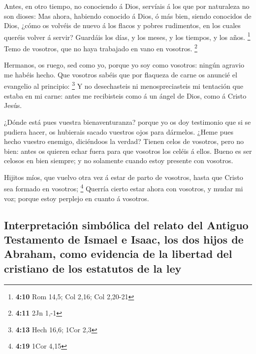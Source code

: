  Antes, en otro tiempo, no conociendo á Dios, servíais á los
que por naturaleza no son dioses:  Mas ahora, habiendo
conocido á Dios, ó más bien, siendo conocidos de Dios, ¿cómo os volvéis
de nuevo á los flacos y pobres rudimentos, en los cuales queréis volver
á servir?  Guardáis los días, y los meses, y los tiempos, y
los años. \footnote{\textbf{4:10} Rom 14,5; Col 2,16; Col 2,20-21}
 Temo de vosotros, que no haya trabajado en vano en
vosotros. \footnote{\textbf{4:11} 2Jn 1,-1}

 Hermanos, os ruego, sed como yo, porque yo soy como
vosotros: ningún agravio me habéis hecho.  Que vosotros
sabéis que por flaqueza de carne os anuncié el evangelio al principio:
\footnote{\textbf{4:13} Hech 16,6; 1Cor 2,3}  Y no
desechasteis ni menospreciasteis mi tentación que estaba en mi carne:
antes me recibisteis como á un ángel de Dios, como á Cristo Jesús.

 ¿Dónde está pues vuestra bienaventuranza? porque yo os doy
testimonio que si se pudiera hacer, os hubierais sacado vuestros ojos
para dármelos.  ¿Heme pues hecho vuestro enemigo,
diciéndoos la verdad?  Tienen celos de vosotros, pero no
bien: antes os quieren echar fuera para que vosotros los celéis á ellos.
 Bueno es ser celosos en bien siempre; y no solamente
cuando estoy presente con vosotros.

 Hijitos míos, que vuelvo otra vez á estar de parto de
vosotros, hasta que Cristo sea formado en vosotros; \footnote{\textbf{4:19}
  1Cor 4,15}  Querría cierto estar ahora con vosotros, y
mudar mi voz; porque estoy perplejo en cuanto á vosotros.

\hypertarget{interpretaciuxf3n-simbuxf3lica-del-relato-del-antiguo-testamento-de-ismael-e-isaac-los-dos-hijos-de-abraham-como-evidencia-de-la-libertad-del-cristiano-de-los-estatutos-de-la-ley}{%
\subsection{Interpretación simbólica del relato del Antiguo Testamento
de Ismael e Isaac, los dos hijos de Abraham, como evidencia de la
libertad del cristiano de los estatutos de la
ley}\label{interpretaciuxf3n-simbuxf3lica-del-relato-del-antiguo-testamento-de-ismael-e-isaac-los-dos-hijos-de-abraham-como-evidencia-de-la-libertad-del-cristiano-de-los-estatutos-de-la-ley}}

